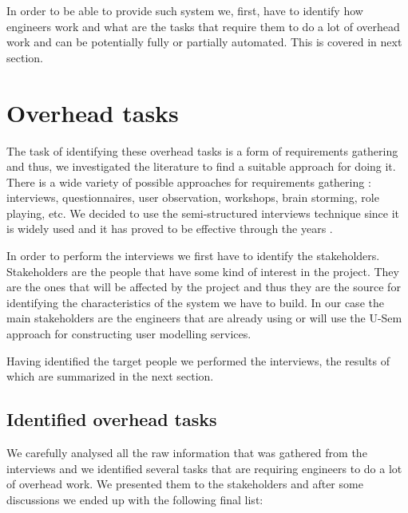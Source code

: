 In order to be able to provide such system we, first, have to identify how engineers work and what are the tasks that require them to do a lot of overhead work and can be potentially fully or partially automated. This is covered in next section.

\section{Overhead tasks}

The task of identifying these overhead tasks is a form of requirements gathering \cite{hickey2004unified} and thus, we investigated the literature to find a suitable approach for doing it. There is a wide variety of possible approaches for requirements gathering \cite{hickey2004unified} : interviews, questionnaires, user observation, workshops, brain storming, role playing, etc. We decided to use the semi-structured interviews technique since it is widely used and it has proved to be effective through the years \cite{dieste2008understanding}.

In order to perform the interviews we first have to identify the stakeholders. Stakeholders are the people that have some kind of interest in the project. They are the ones that will be affected by the project and thus they are the source for identifying the characteristics of the system we have to build. In our case the main stakeholders are the engineers that are already using or will use the U-Sem approach for constructing user modelling services. 

Having identified the target people we performed the interviews, the results of which are summarized in the next section. 

\subsection{Identified overhead tasks}
\label{sec:features}

We carefully analysed all the raw information that was gathered from the interviews and we identified several tasks that are requiring engineers to do a lot of overhead work. We presented them to the stakeholders and after some discussions we ended up with the following final list: 

